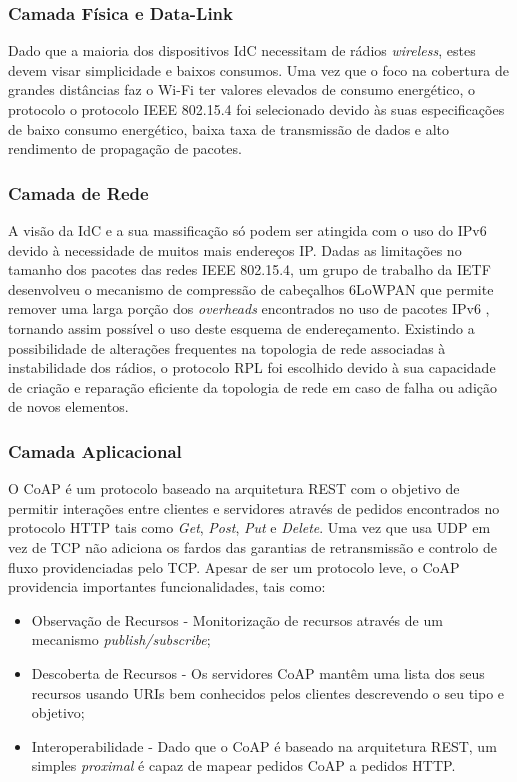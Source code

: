 \documentclass{llncs}
\begin{document}
\subsubsection{Camada Física e Data-Link}
\label{sec:data_link}
Dado que a maioria dos dispositivos \ac{IdC} necessitam de rádios \textit{wireless}, estes devem visar simplicidade e baixos consumos. Uma vez que o foco na cobertura de grandes distâncias faz o Wi-Fi\cite{IEEE2012} ter valores elevados de consumo energético, o protocolo o protocolo IEEE 802.15.4 \cite{IEEEComputerSociety2011} foi selecionado devido às suas especificações de baixo consumo energético, baixa taxa de transmissão de dados e alto rendimento de propagação de pacotes.

\subsubsection{Camada de Rede}
\label{sec:network_layer}
A visão da \ac{IdC} e a sua massificação só podem ser atingida com o uso do IPv6 \cite{Pickard2015} devido à necessidade de muitos mais endereços IP.
Dadas as limitações no tamanho dos pacotes das redes IEEE 802.15.4, um grupo de trabalho da \ac{IETF} desenvolveu o mecanismo de compressão de cabeçalhos \ac{6LoWPAN} \cite{Shelby2012} que permite remover uma larga porção dos \textit{overheads} encontrados no uso de pacotes IPv6 \cite{Hui2008}, tornando assim possível o uso deste esquema de endereçamento. Existindo a possibilidade de alterações frequentes na topologia de rede associadas à instabilidade dos rádios, o protocolo \ac{RPL} \cite{Winter2012} foi escolhido devido à sua capacidade de criação e reparação eficiente da topologia de rede em caso de falha ou adição de novos elementos.

\subsubsection{Camada Aplicacional}
O \ac{CoAP} \cite{Shelby2014} é um protocolo baseado na arquitetura \ac{REST} com o objetivo de permitir interações entre clientes e servidores através de pedidos encontrados no protocolo HTTP tais como \textit{Get}, \textit{Post}, \textit{Put} e \textit{Delete}. Uma vez que usa \ac{UDP} em vez de \ac{TCP} não adiciona os fardos das garantias de retransmissão e controlo de fluxo providenciadas pelo \ac{TCP}. Apesar de ser um protocolo leve, o \ac{CoAP} providencia importantes funcionalidades, tais como:
\begin{itemize}
	\item Observação de Recursos - Monitorização de recursos através de um mecanismo \textit{publish/subscribe};		\item Descoberta de Recursos - Os servidores \ac{CoAP} mantêm uma lista dos seus recursos usando \ac{URIs} bem conhecidos pelos clientes descrevendo o seu tipo e objetivo;
	\item Interoperabilidade - Dado que o \ac{CoAP} é baseado na arquitetura \ac{REST}, um simples \textit{proximal} é capaz de mapear pedidos \ac{CoAP} a pedidos \ac{HTTP}.
\end{itemize}
\end{document}

